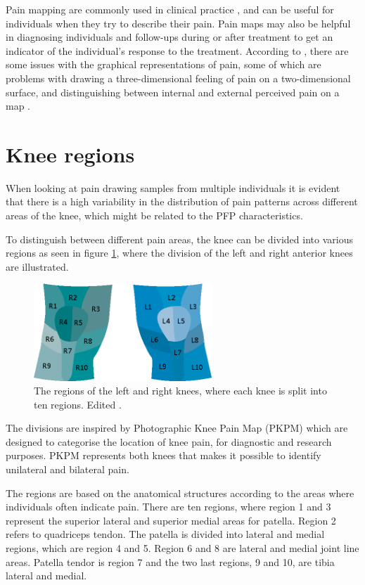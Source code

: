 \noindent
Pain mapping are commonly used in clinical practice \citep{Schott2010}, and can be useful for individuals when they try to describe their pain. Pain maps may also be helpful in diagnosing individuals and follow-ups during or after treatment to get an indicator of the individual's response to the treatment.\citep{Boudreau2016}
According to \citeauthor{Schott2010}, there are some issues with the graphical representations of pain, some of which are problems with drawing a three-dimensional feeling of pain on a two-dimensional surface, and distinguishing between internal and external perceived pain on a map \citep{Schott2010}.

\section{Knee regions}
When looking at pain drawing samples from multiple individuals it is evident that there is a high variability in the distribution of pain patterns across different areas of the knee, which might be related to the PFP characteristics.

\noindent
To distinguish between different pain areas, the knee can be divided into various regions as seen in figure \ref{fig:atlas}, where the division of the left and right anterior knees are illustrated. 

\begin{figure} [H] 
\centering
\includegraphics[width=0.6\textwidth]{figures/atlas}
\caption{The regions of the left and right knees, where each knee is split into ten regions. Edited \citep{Elson2010}.}
\label{fig:atlas}
\end{figure}

\noindent
The divisions are inspired by Photographic Knee Pain Map (PKPM) which are designed to categorise the location of knee pain, for diagnostic and research purposes. PKPM represents both knees that makes it possible to identify unilateral and bilateral pain.\citep{Elson2010}

\noindent
The regions are based on the anatomical structures according to the areas where individuals often indicate pain.
There are ten regions, where region 1 and 3 represent the superior lateral and superior medial areas for patella. Region 2 refers to quadriceps tendon. The patella is divided into lateral and medial regions, which are region 4 and 5. Region 6 and 8 are lateral and medial joint line areas. Patella tendor is region 7 and the two last regions, 9 and 10, are tibia lateral and medial.\citep{Elson2010}

\newpage
